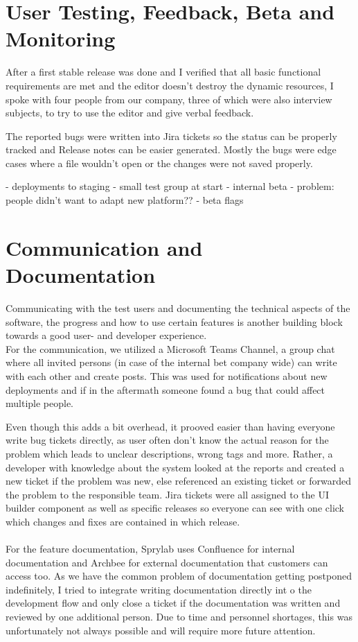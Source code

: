 \section{User Testing, Feedback, Beta and Monitoring}

After a first stable release was done and I verified that all basic functional requirements are met and the editor doesn't destroy the dynamic resources,
I spoke with four people from our company, three of which were also interview subjects, to try to use the editor and give verbal feedback.

The reported bugs were written into Jira tickets so the status can be properly tracked and Release notes can be easier generated.
Mostly the bugs were edge cases where a file wouldn't open or the changes were not saved properly.

- deployments to staging
- small test group at start
- internal beta
 - problem: people didn't want to adapt new platform??
- beta flags

\section{Communication and Documentation}
Communicating with the test users and documenting the technical aspects of the software, the progress and how to use certain features is
another building block towards a good user- and developer experience.
\\
For the communication, we utilized a Microsoft Teams Channel, a group chat where all invited persons (in case of the internal bet company wide) can write with each other and create posts.
This was used for notifications about new deployments and if in the aftermath someone found a bug that could affect multiple people.

Even though this adds a bit overhead, it prooved easier than having everyone write bug tickets directly, as user often don't know the actual reason for the problem which leads to unclear descriptions, wrong tags and more.
Rather, a developer with knowledge about the system looked at the reports and created a new ticket if the problem was new, else referenced an existing ticket or forwarded the problem to the responsible team.
Jira tickets were all assigned to the UI builder component as well as specific releases so everyone can see with one click which changes and fixes are contained in which release.
\\\\
For the feature documentation, Sprylab uses Confluence for internal documentation and Archbee for external documentation that customers can access too.
As we have the common problem of documentation getting postponed indefinitely, I tried to integrate writing documentation directly int o the development flow and only close a ticket if the documentation
was written and reviewed by one additional person. Due to time and personnel shortages, this was unfortunately not always possible and will require more future attention.

